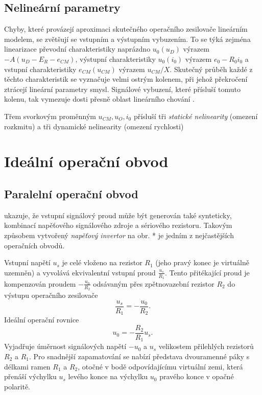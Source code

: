     \subsection{Nelineární parametry}
      Chyby, které provázejí aproximaci skutečného operačního zesilovače lineár\-ním modelem, se 
      zvětšují se vstupním a výstupním vybuzením. To se týká zejména linearizace převodní 
      charakteristiky naprázdno $u_0(u_D)$ výrazem $-A(u_D-E_R-e_{CM})$, výstupní charakteristiky 
      $u_0(i_0)$ výrazem $e_0-R_0i_0$ a vstupní charakteristiky $e_{CM}(u_{CM})$ výrazem 
      $u_{CM}/X$.  Skutečný průběh každé z těchto charakteristik se vyznačuje velmi ostrým kolenem, 
      při jehož překročení ztrácejí lineární parametry smysl.  Signálové vybuzení, které přísluší 
      tomuto kolenu, tak vymezuje dosti přesně oblast lineárního chování \cite[s.~29]{Dostal}.
  
      Třem svorkovým proměnným $u_{CM}, u_O, i_0$ přísluší tři \emph{statické nelinearity} (omezení 
      rozkmitu) a tři dynamické nelinearity (omezení rychlosti)
  
  \section{Ideální operační obvod}
    \subsection{Paralelní operační obvod}
       ukazuje, že vstupní signálový proud může být generován také 
      synteticky, kombinací napěťového signálového zdroje a sériového rezistoru. Takovým způsobem 
      vytvořený \emph{napěťový invertor} na obr. * je jedním z nejčastějších operačních obvodů. 
      
      Vstupní napětí $u_s$ je celé vloženo na rezistor $R_1$ (jeho pravý konec je virtuálně uzemněn) 
      a vyvolává ekvivalentní vstupní proud $\frac{u_s}{R_1}$. Tento přitékající proud je 
      kompenzován proudem $-\frac{u_0}{R_2}$ odsávaným přes zpětnovazební rezistor $R_2$ do výstupu 
      operačního zesilovače $$\frac{u_s}{R_1}=-\frac{u_0}{R_2}.$$ Ideální operační rovnice
      \begin{equation}\label{AES:eq_opamp_inv02}
        u_0 = - \frac{R_2}{R_1}u_s.
      \end{equation}
      Vyjadřuje úměrnost signálových napětí $-u_0$ a $u_s$ velikostem přilehlých rezistorů $R_2$ a 
      $R_1$. Pro snadnější zapamatování se nabízí představa dvouramenné páky s délkami ramen $R_1$ a 
      $R_2$, otočné v bodě odpovídajícímu virtuální zemi, která přenáší výchylku $u_s$ levého konce 
      na výchylku $u_0$ pravého konce v opačné polaritě.

